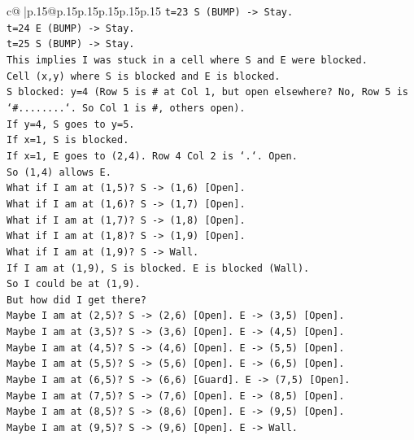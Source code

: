 \documentclass{article}
\begin{document}
{\begin{supertabular}{c@{$\;$}|p{.15\linewidth}@{}p{.15\linewidth}p{.15\linewidth}p{.15\linewidth}p{.15\linewidth}p{.15\linewidth}}
{{{\texttt{t=23 S (BUMP) {-}> Stay.} \\
\texttt{t=24 E (BUMP) {-}> Stay.} \\
\texttt{t=25 S (BUMP) {-}> Stay.} \\
\texttt{This implies I was stuck in a cell where S and E were blocked.} \\
\texttt{Cell (x,y) where S is blocked and E is blocked.} \\
\texttt{S blocked: y=4 (Row 5 is \# at Col 1, but open elsewhere? No, Row 5 is `\#........`. So Col 1 is \#, others open).} \\
\texttt{If y=4, S goes to y=5.} \\
\texttt{If x=1, S is blocked.} \\
\texttt{If x=1, E goes to (2,4). Row 4 Col 2 is `.`. Open.} \\
\texttt{So (1,4) allows E.} \\
\texttt{What if I am at (1,5)? S {-}> (1,6) {[}Open{]}.} \\
\texttt{What if I am at (1,6)? S {-}> (1,7) {[}Open{]}.} \\
\texttt{What if I am at (1,7)? S {-}> (1,8) {[}Open{]}.} \\
\texttt{What if I am at (1,8)? S {-}> (1,9) {[}Open{]}.} \\
\texttt{What if I am at (1,9)? S {-}> Wall.} \\
\texttt{If I am at (1,9), S is blocked. E is blocked (Wall).} \\
\texttt{So I could be at (1,9).} \\
\texttt{But how did I get there?} \\
\texttt{Maybe I am at (2,5)? S {-}> (2,6) {[}Open{]}. E {-}> (3,5) {[}Open{]}.} \\
\texttt{Maybe I am at (3,5)? S {-}> (3,6) {[}Open{]}. E {-}> (4,5) {[}Open{]}.} \\
\texttt{Maybe I am at (4,5)? S {-}> (4,6) {[}Open{]}. E {-}> (5,5) {[}Open{]}.} \\
\texttt{Maybe I am at (5,5)? S {-}> (5,6) {[}Open{]}. E {-}> (6,5) {[}Open{]}.} \\
\texttt{Maybe I am at (6,5)? S {-}> (6,6) {[}Guard{]}. E {-}> (7,5) {[}Open{]}.} \\
\texttt{Maybe I am at (7,5)? S {-}> (7,6) {[}Open{]}. E {-}> (8,5) {[}Open{]}.} \\
\texttt{Maybe I am at (8,5)? S {-}> (8,6) {[}Open{]}. E {-}> (9,5) {[}Open{]}.} \\
\texttt{Maybe I am at (9,5)? S {-}> (9,6) {[}Open{]}. E {-}> Wall.} \\
}}}
\end{supertabular}}
\end{document}
